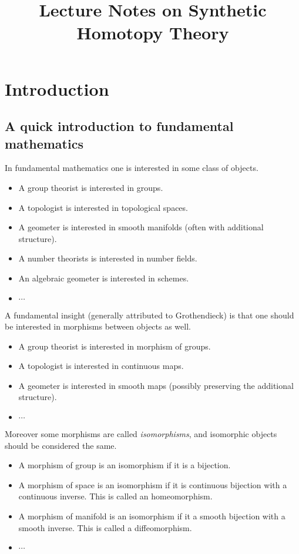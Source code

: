 \documentclass{article}
\title{Lecture Notes on Synthetic Homotopy Theory}
\newcommand{\se}[1]{\medbreak \medbreak \section{#1}}
\newcommand{\sse}[1]{\medbreak \subsection{#1}}
\begin{document}
\maketitle

\begin{abstract}
\end{abstract}

\tableofcontents


\se{Introduction}

\sse{A quick introduction to fundamental mathematics}

In fundamental mathematics one is interested in some class of objects.

\begin{itemize}
\item A group theorist is interested in groups.
\item A topologist is interested in topological spaces.
\item A geometer is interested in smooth manifolds (often with additional structure).
\item A number theorists is interested in number fields.
\item An algebraic geometer is interested in schemes.
\item $\cdots$
\end{itemize}

A fundamental insight (generally attributed to Grothendieck) is that one should be interested in morphisms between objects as well.

\begin{itemize}
\item A group theorist is interested in morphism of groups.
\item A topologist is interested in continuous maps.
\item A geometer is interested in smooth maps (possibly preserving the additional structure).
\item $\cdots$
\end{itemize}

Moreover some morphisms are called \emph{isomorphisms}, and isomorphic objects should be considered the same.

\begin{itemize}
\item A morphism of group is an isomorphism if it is a bijection.
\item A morphism of space is an isomorphism if it is continuous bijection with a continuous inverse. This is called an homeomorphism.
\item A morphism of manifold is an isomorphism if it a smooth bijection with a smooth inverse. This is called a diffeomorphism.
\item $\cdots$
\end{itemize}
\end{document}
